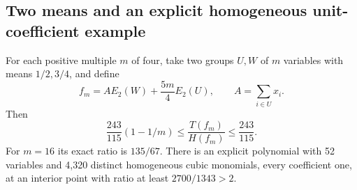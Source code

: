\subsection{Two means and an explicit homogeneous unit-coefficient example}
\begin{theorem}\label{thm:cubic-two-level}
For each positive multiple $m$ of four, take two groups $U,W$ of $m$
variables with means $1/2,3/4$, and define
\begin{equation}\label{eq:two-level-family}
 f_m=A E_2(W)+\frac{5m}{4}E_2(U),\qquad A=\sum_{i\in U}x_i.
\end{equation}
Then
\begin{equation}\label{eq:two-level-ratio}
 \frac{243}{115}(1-1/m)\le\frac{T(f_m)}{H(f_m)}\le\frac{243}{115}.
\end{equation}
For $m=16$ its exact ratio is $135/67$. There is an explicit polynomial
with 52 variables and 4,320 distinct homogeneous cubic monomials, every
coefficient one, at an interior point with ratio at least $2700/1343>2$.
\end{theorem}

